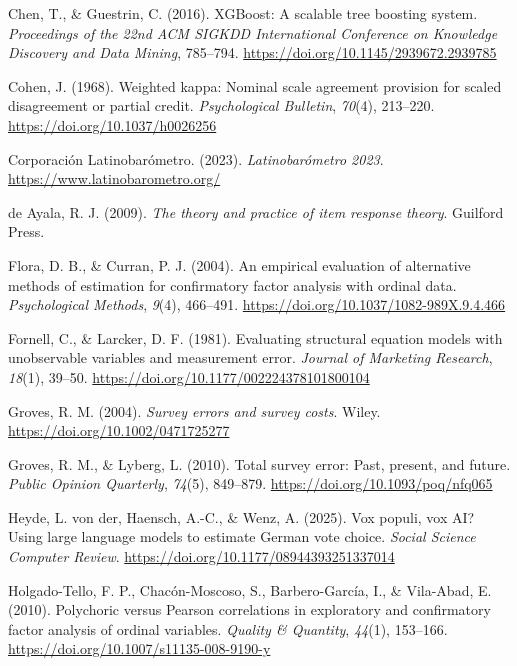 \documentclass[
  man,
  floatsintext,
  longtable,
  nolmodern,
  notxfonts,
  notimes,
  colorlinks=true,linkcolor=blue,citecolor=blue,urlcolor=blue]{apa7}
\newlength{\cslhangindent}
\newenvironment{CSLReferences}[2] %
 {\begin{list}{}{%
  \setlength{\itemindent}{0pt}
  \setlength{\leftmargin}{0pt}
  \setlength{\parsep}{0pt}
  \ifodd #1
   \setlength{\leftmargin}{\cslhangindent}
   \setlength{\itemindent}{-1\cslhangindent}
  \fi
  \setlength{\itemsep}{#2\baselineskip}}}
 {\end{list}}
\begin{document}
\begin{CSLReferences}{1}{0}
Chen, T., \& Guestrin, C. (2016). {XGBoost}: A scalable tree boosting
system. \emph{Proceedings of the 22nd ACM SIGKDD International
Conference on Knowledge Discovery and Data Mining}, 785--794.
\url{https://doi.org/10.1145/2939672.2939785}

Cohen, J. (1968). Weighted kappa: Nominal scale agreement provision for
scaled disagreement or partial credit. \emph{Psychological Bulletin},
\emph{70}(4), 213--220. \url{https://doi.org/10.1037/h0026256}

Corporación Latinobarómetro. (2023). \emph{{Latinobar{ó}metro} 2023}.
\url{https://www.latinobarometro.org/}

de Ayala, R. J. (2009). \emph{The theory and practice of item response
theory}. Guilford Press.

Flora, D. B., \& Curran, P. J. (2004). An empirical evaluation of
alternative methods of estimation for confirmatory factor analysis with
ordinal data. \emph{Psychological Methods}, \emph{9}(4), 466--491.
\url{https://doi.org/10.1037/1082-989X.9.4.466}

Fornell, C., \& Larcker, D. F. (1981). Evaluating structural equation
models with unobservable variables and measurement error. \emph{Journal
of Marketing Research}, \emph{18}(1), 39--50.
\url{https://doi.org/10.1177/002224378101800104}

Groves, R. M. (2004). \emph{Survey errors and survey costs}. Wiley.
\url{https://doi.org/10.1002/0471725277}

Groves, R. M., \& Lyberg, L. (2010). Total survey error: Past, present,
and future. \emph{Public Opinion Quarterly}, \emph{74}(5), 849--879.
\url{https://doi.org/10.1093/poq/nfq065}

Heyde, L. von der, Haensch, A.-C., \& Wenz, A. (2025). Vox populi, vox
{AI}? {Using} large language models to estimate {German} vote choice.
\emph{Social Science Computer Review}.
\url{https://doi.org/10.1177/08944393251337014}

Holgado-Tello, F. P., Chacón-Moscoso, S., Barbero-García, I., \&
Vila-Abad, E. (2010). Polychoric versus {Pearson} correlations in
exploratory and confirmatory factor analysis of ordinal variables.
\emph{Quality \& Quantity}, \emph{44}(1), 153--166.
\url{https://doi.org/10.1007/s11135-008-9190-y}


\end{CSLReferences}
\end{document}
